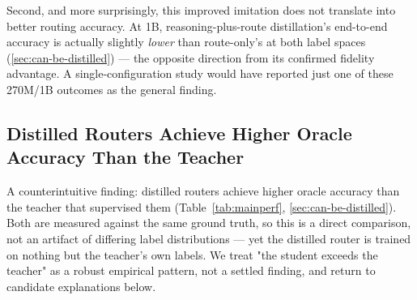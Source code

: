 \documentclass{article}
\begin{document}
Second, and more surprisingly, this improved imitation does not
translate into better routing accuracy. At 1B, reasoning-plus-route
distillation's end-to-end accuracy is actually slightly \emph{lower}
than route-only's at both label spaces (\ref{sec:can-be-distilled}) —
the opposite direction from its confirmed fidelity advantage. A
single-configuration study would have reported just one of these
270M/1B outcomes as the general finding.

\subsection{Distilled Routers Achieve Higher Oracle Accuracy Than the Teacher}
\label{sec:distillation-improves-teacher}

A counterintuitive finding: distilled routers achieve higher oracle
accuracy than the teacher that supervised them
(Table~\ref{tab:mainperf}, \ref{sec:can-be-distilled}). Both are
measured against the same ground truth, so this is a direct
comparison, not an artifact of differing label distributions — yet the
distilled router is trained on nothing but the teacher's own labels.
We treat "the student exceeds the teacher" as a robust empirical
pattern, not a settled finding, and return to candidate explanations
below.
\end{document}
